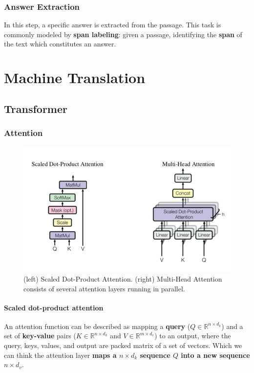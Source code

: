 \documentclass[a3paper, 12pt]{book} %
\newcommand\bolden[1]{{\boldmath\bfseries#1}}
\begin{document}
\subsection{Answer Extraction}
In this step, a specific answer is extracted from the passage. This task is commonly modeled by \textbf{span labeling}: given a passage, identifying the \textbf{span} of the text which constitutes an answer.


\chapter{Machine Translation}
\section{Transformer}

\subsection{Attention}
\begin{figure}[htpb]
	\centering
	\includegraphics[width=\linewidth]{figures/attention_transformer.png}
	\caption{(left) Scaled Dot-Product Attention. (right) Multi-Head Attention consists of several attention layers running in parallel.}
	\label{fig:boat1}
\end{figure}

\subsubsection{Scaled dot-product attention}
An attention function can be described as mapping a \textbf{query} ($Q \in \mathbb{R}^{n\times d_k}$) and a set of \textbf{key-value} pairs ($K \in \mathbb{R}^{n\times d_k} $ and $V \in \mathbb{R}^{m \times d_v}$) to an output, where the query, keys, values, and output are packed matrix of a set of vectors. Which we can think the attention layer \bolden{maps a $n\times d_k$ sequence $Q$  into a new sequence $n \times d_v$}. \\
\end{document}
